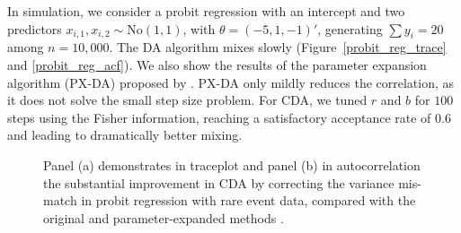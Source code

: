 \documentclass[11pt]{article}
\newcommand{\No}{\text{No}}
\begin{document}
 In simulation, we consider a probit regression with an intercept and two predictors $x_{i,1},x_{i,2}\sim \No(1,1)$, with $\theta=(-5,1,-1)'$, generating $\sum y_i=20$ among $n=10,000$. The \cite{albert1993bayesian} DA algorithm mixes slowly (Figure~\ref{probit_reg_trace} and \ref{probit_reg_acf}). We also show the 
results of the parameter expansion algorithm (PX-DA) proposed by \cite{liu1999parameter}. PX-DA only mildly reduces the correlation, as it does not solve the small step size problem.  For CDA, we tuned $r$ and $b$ for $100$ steps using the Fisher information, reaching a satisfactory acceptance rate of $0.6$ {and leading to dramatically better mixing}. 


\begin{figure}[H]
  {%
    \qquad
  }
 {\caption{Panel (a) demonstrates in traceplot and panel (b) in autocorrelation the substantial improvement in CDA by correcting the variance mis-match in probit regression with rare event data, compared with the original \citep{albert1993bayesian} and parameter-expanded methods \citep{liu1999parameter}.}}
\end{figure}
\end{document}
